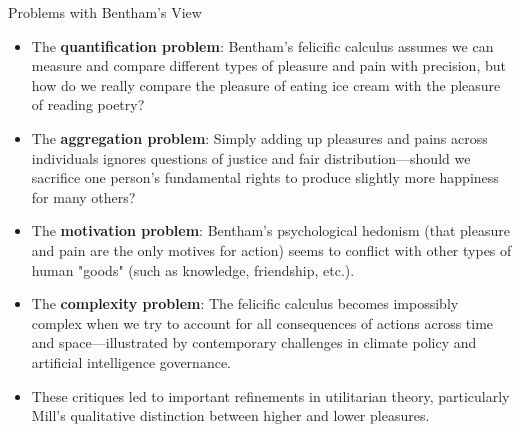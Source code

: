 \documentclass[aspectratio=169]{beamer}
\begin{document}
\begin{frame}{Problems with Bentham's View}
    \begin{itemize}
        \item The \textbf{quantification problem}: Bentham's felicific calculus assumes we can measure and compare different types of pleasure and pain with precision, but how do we really compare the pleasure of eating ice cream with the pleasure of reading poetry?
        
        \item The \textbf{aggregation problem}: Simply adding up pleasures and pains across individuals ignores questions of justice and fair distribution—should we sacrifice one person's fundamental rights to produce slightly more happiness for many others?
        
        \item The \textbf{motivation problem}: Bentham's psychological hedonism (that pleasure and pain are the only motives for action) seems to conflict with other types of human "goods" (such as knowledge, friendship, etc.).
        
        \item The \textbf{complexity problem}: The felicific calculus becomes impossibly complex when we try to account for all consequences of actions across time and space—illustrated by contemporary challenges in climate policy and artificial intelligence governance.
        
        \item These critiques led to important refinements in utilitarian theory, particularly Mill's qualitative distinction between higher and lower pleasures.
    \end{itemize}
\end{frame}
\end{document}
